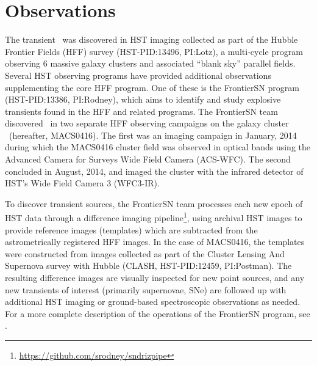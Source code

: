 \section{Observations}\label{sec:Observations}

The transient \spock\ was discovered in HST imaging collected as part
of the Hubble Frontier Fields (HFF) survey (HST-PID:13496, PI:Lotz), a
multi-cycle program observing 6 massive galaxy clusters and associated
``blank sky'' parallel fields.  Several HST observing programs have
provided additional observations supplementing the core HFF program.
One of these is the FrontierSN program (HST-PID:13386, PI:Rodney),
which aims to identify and study explosive transients found in the HFF
and related programs.  The FrontierSN team discovered \spock\ in two
separate HFF observing campaigns on the galaxy cluster
\ (hereafter, MACS0416).  The first was an imaging campaign
in January, 2014 during which the MACS0416 cluster field was observed
in optical bands using the Advanced Camera for Surveys Wide Field
Camera (ACS-WFC).  The second concluded in August, 2014, and imaged
the cluster with the infrared detector of HST's Wide Field Camera 3
(WFC3-IR).

To discover transient sources, the FrontierSN team processes each new
epoch of HST data through a difference imaging
pipeline\footnote{\url{https://github.com/srodney/sndrizpipe}}, using
archival HST images to provide reference images (templates) which are
subtracted from the astrometrically registered HFF images. In the case
of MACS0416, the templates were constructed from images collected as
part of the Cluster Lensing And Supernova survey with Hubble (CLASH,
HST-PID:12459, PI:Postman). The resulting difference images are
visually inspected for new point sources, and any new transients of
interest (primarily supernovae, SNe) are followed up with additional
HST imaging or ground-based spectroscopic observations as needed.  For
a more complete description of the operations of the FrontierSN
program, see \citet{Rodney:2015a}.

